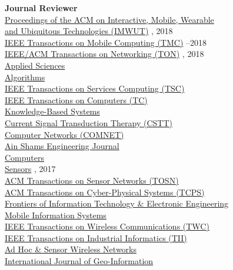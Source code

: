 {\bf Journal Reviewer}\\
{\href{https://imwut.acm.org}{Proceedings of the ACM on Interactive, Mobile, Wearable \\\mbox{\hspace{0.6cm}} and Ubiquitous Technologies (IMWUT)}} , 2018\\
{\href{https://www.computer.org/portal/web/tmc}{IEEE Transactions on Mobile Computing (TMC)}} --2018\\
{\href{http://ieeexplore.ieee.org/xpl/RecentIssue.jsp?punumber=90}{IEEE/ACM Transactions on Networking (TON)}} , 2018\\
{\href{http://www.mdpi.com/journal/applsci}{Applied Sciences}} \\
{\href{http://www.mdpi.com/journal/algorithms}{Algorithms}} \\
{\href{https://www.computer.org/web/tsc}{IEEE Transactions on Services Computing (TSC)}} \\
{\href{https://www.computer.org/web/tc}{IEEE Transactions on Computers (TC)}} \\
{\href{https://www.journals.elsevier.com/knowledge-based-systems}{Knowledge-Based Systems}} \\
{\href{http://benthamscience.com/journals/current-signal-transduction-therapy/}{Current Signal Transduction Therapy (CSTT)}} \\
{\href{http://ees.elsevier.com/comnet/}{Computer Networks (COMNET)}} \\
{\href{https://www.journals.elsevier.com/ain-shams-engineering-journal}{Ain Shams Engineering Journal}} \\
{\href{http://www.mdpi.com/journal/computers}{Computers}} \\
{\href{http://www.mdpi.com/journal/sensors}{Sensors}} , 2017\\
{\href{http://tosn.acm.org/}{ACM Transactions on Sensor Networks (TOSN)}} \\
{\href{http://tcps.acm.org/}{ACM Transactions on Cyber-Physical Systems (TCPS)}} \\
{\href{http://www.springer.com/computer/journal/11714}{Frontiers of Information Technology \& Electronic Engineering}} \\
{\href{https://www.hindawi.com/journals/misy/}{Mobile Information Systems}} \\
{\href{http://www.comsoc.org/twc}{IEEE Transactions on Wireless Communications (TWC)}} \\
{\href{http://www.ieee-ies.org/pubs/transactions-on-industrial-informatics}{IEEE Transactions on Industrial Informatics (TII)}} \\
{\href{http://www.oldcitypublishing.com/AHSWN/AHSWN.html}{Ad Hoc \& Sensor Wireless Networks}} \\
{\href{http://www.mdpi.com/journal/ijgi}{International Journal of Geo-Information}} \\
